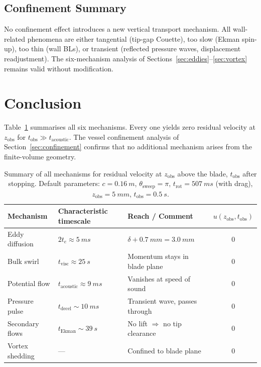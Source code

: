 \documentclass[11pt,a4paper]{article}
\begin{document}
\subsection{Confinement Summary}

No confinement effect introduces a new vertical transport mechanism.
All wall-related phenomena are either tangential (tip-gap Couette),
too slow (Ekman spin-up), too thin (wall BLs), or transient
(reflected pressure waves, displacement readjustment). The six-mechanism
analysis of Sections~\ref{sec:eddies}--\ref{sec:vortex} remains valid
without modification.


\section{Conclusion}
\label{sec:conclusion}

Table~\ref{tab:summary} summarises all six mechanisms. Every one yields
zero residual velocity at $z_\mathrm{obs}$ for
$t_\mathrm{obs} \gg t_\mathrm{acoustic}$. The vessel confinement
analysis of Section~\ref{sec:confinement} confirms that no additional
mechanism arises from the finite-volume geometry.

\begin{table}[H]
\centering
\caption{Summary of all mechanisms for residual velocity at
$z_\mathrm{obs}$ above the blade, $t_\mathrm{obs}$ after stopping.
Default parameters: $c = \SI{0.16}{m}$,
$\theta_\mathrm{sweep} = \pi$, $t_\mathrm{rot} = \SI{507}{ms}$ (with drag),
$z_\mathrm{obs} = \SI{5}{mm}$, $t_\mathrm{obs} = \SI{0.5}{s}$.}
\label{tab:summary}
\begin{tabular}{lllc}
\toprule
Mechanism & Characteristic timescale & Reach / Comment
  & $u(z_\mathrm{obs}, t_\mathrm{obs})$ \\
\midrule
Eddy diffusion
  & $2 t_e \approx \SI{5}{ms}$
  & $\delta + \SI{0.7}{mm} = \SI{3.0}{mm}$
  & 0 \\
Bulk swirl
  & $t_\mathrm{visc} \approx \SI{25}{s}$
  & Momentum stays in blade plane
  & 0 \\
Potential flow
  & $t_\mathrm{acoustic} \approx \SI{9}{ms}$
  & Vanishes at speed of sound
  & 0 \\
Pressure pulse
  & $t_\mathrm{decel} \sim \SI{10}{ms}$
  & Transient wave, passes through
  & 0 \\
Secondary flows
  & $t_\mathrm{Ekman} \sim \SI{39}{s}$
  & No lift $\Rightarrow$ no tip clearance
  & 0 \\
Vortex shedding
  & ---
  & Confined to blade plane
  & 0 \\
\bottomrule
\end{tabular}
\end{table}
\end{document}
